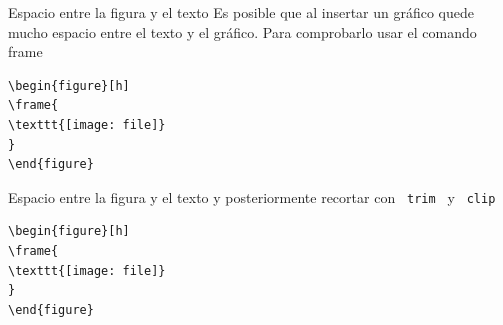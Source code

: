 \documentclass[10pt]{beamer}
\begin{document}
\begin{frame}[fragile]{Espacio entre la figura y el texto}
Es posible que al insertar un gráfico quede mucho espacio entre
el texto y el gráfico.  Para comprobarlo usar el comando frame
\begin{figure}
\end{figure}
\begin{verbatim}
\begin{figure}[h]
\frame{
\texttt{[image: file]}
}
\end{figure}
\end{verbatim}




\end{frame}


\begin{frame}[fragile]{Espacio entre la figura y el texto}
y posteriormente recortar con \verb| trim | y \verb| clip|
\begin{figure}
\vspace{2cm}
\end{figure}
\begin{verbatim}
\begin{figure}[h]
\frame{
\texttt{[image: file]}
}
\end{figure}
\end{verbatim}
\end{frame}
\end{document}
